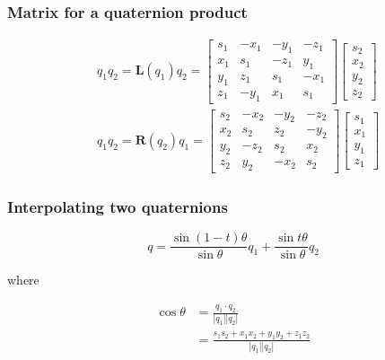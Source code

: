 \subsubsection*{Matrix for a quaternion product}
$$
\begin{aligned}
& q_{1} q_{2}=\mathbf{L}\left(q_{1}\right) q_{2}= {\left[\begin{array}{cccc}
s_{1} & -x_{1} & -y_{1} & -z_{1} \\
x_{1} & s_{1} & -z_{1} & y_{1} \\
y_{1} & z_{1} & s_{1} & -x_{1} \\
z_{1} & -y_{1} & x_{1} & s_{1}
\end{array}\right]\left[\begin{array}{l}
s_{2} \\
x_{2} \\
y_{2} \\
z_{2}
\end{array}\right] } \\
& q_{1} q_{2}=\mathbf{R}\left(q_{2}\right) q_{1}=\left[\begin{array}{cccc}
s_{2} & -x_{2} & -y_{2} & -z_{2} \\
x_{2} & s_{2} & z_{2} & -y_{2} \\
y_{2} & -z_{2} & s_{2} & x_{2} \\
z_{2} & y_{2} & -x_{2} & s_{2}
\end{array}\right]\left[\begin{array}{l}
s_{1} \\
x_{1} \\
y_{1} \\
z_{1}
\end{array}\right]
\end{aligned}
$$

\subsubsection*{Interpolating two quaternions}
$$
q=\frac{\sin (1-t) \theta}{\sin \theta} q_{1}+\frac{\sin t \theta}{\sin \theta} q_{2}
$$

where

$$
\begin{aligned}
\cos \theta & =\frac{q_{1} \cdot q_{2}}{\left|q_{1}\right|\left|q_{2}\right|} \\
& =\frac{s_{1} s_{2}+x_{1} x_{2}+y_{1} y_{2}+z_{1} z_{2}}{\left|q_{1}\right|\left|q_{2}\right|}
\end{aligned}
$$

